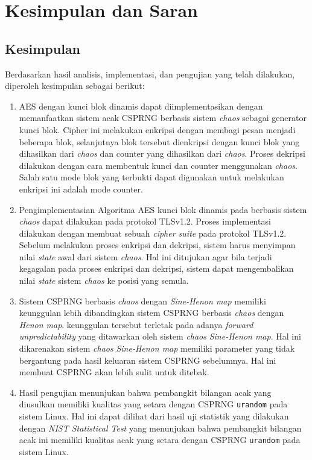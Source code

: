\chapter{Kesimpulan dan Saran}

\section{Kesimpulan}
Berdasarkan hasil analisis, implementasi, dan pengujian yang telah dilakukan, diperoleh kesimpulan sebagai berikut:
\begin{enumerate}
  \item AES dengan kunci blok dinamis dapat diimplementasikan dengan memanfaatkan sistem acak CSPRNG berbasis sistem \emph{chaos} sebagai generator kunci blok. Cipher ini melakukan enkripsi dengan membagi pesan menjadi beberapa blok, selanjutnya blok tersebut dienkripsi dengan kunci blok yang dihasilkan dari \emph{chaos} dan counter yang dihasilkan dari \emph{chaos}. Proses dekripsi dilakukan dengan cara membentuk kunci dan counter menggunakan \emph{chaos}. Salah satu mode blok yang terbukti dapat digunakan untuk melakukan enkripsi ini adalah mode counter.
  \item Pengimplementasian Algoritma AES kunci blok dinamis pada berbasis sistem \emph{chaos} dapat dilakukan pada protokol TLSv1.2. Proses implementasi dilakukan dengan membuat sebuah \emph{cipher suite} pada protokol TLSv1.2. Sebelum melakukan proses enkripsi dan dekripsi, sistem harus menyimpan nilai \emph{state} awal dari sistem \emph{chaos}. Hal ini ditujukan agar bila terjadi kegagalan pada proses enkripsi dan dekripsi, sistem dapat mengembalikan nilai \emph{state} sistem \emph{chaos} ke posisi yang semula.
  \item Sistem CSPRNG berbasis \emph{chaos} dengan \emph{Sine-Henon map} memiliki keunggulan lebih dibandingkan sistem CSPRNG berbasis \emph{chaos} dengan \emph{Henon map}. keunggulan tersebut terletak pada adanya \emph{forward unpredictability} yang ditawarkan oleh sistem \emph{chaos} \emph{Sine-Henon map}. Hal ini dikarenakan sistem \emph{chaos} \emph{Sine-Henon map} memiliki parameter yang tidak bergantung pada hasil keluaran sistem CSPRNG sebelumnya. Hal ini membuat CSPRNG akan lebih sulit untuk ditebak.
  \item Hasil pengujian menunjukan bahwa pembangkit bilangan acak yang diusulkan memiliki kualitas yang setara dengan CSPRNG \texttt{urandom} pada sistem Linux. Hal ini dapat dilihat dari hasil uji statistik yang dilakukan dengan \emph{NIST Statistical Test} yang menunjukan bahwa pembangkit bilangan acak ini memiliki kualitas acak yang setara dengan CSPRNG \texttt{urandom} pada sistem Linux.

\end{enumerate}
